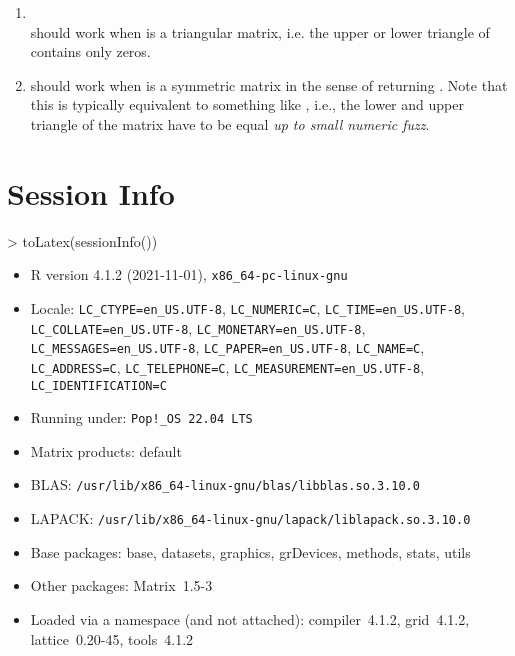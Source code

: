 \documentclass{article}
\begin{document}
\begin{description}
  \begin{enumerate}
  \item {} \\
       should work when  is a triangular matrix, i.e. the upper or
       lower triangle of  contains only zeros.

  \item {}
       should work when  is a symmetric matrix in the sense of
        returning .
       Note that this is typically equivalent to something like
       , i.e., the lower and upper
       triangle of the matrix have to be equal \emph{up to small
       numeric fuzz}.
  \end{enumerate}

\end{description}



\section{Session Info}

\begin{Schunk}
\begin{Sinput}
> toLatex(sessionInfo())
\end{Sinput}
\begin{itemize}\raggedright
  \item R version 4.1.2 (2021-11-01), \verb|x86_64-pc-linux-gnu|
  \item Locale: \verb|LC_CTYPE=en_US.UTF-8|, \verb|LC_NUMERIC=C|, \verb|LC_TIME=en_US.UTF-8|, \verb|LC_COLLATE=en_US.UTF-8|, \verb|LC_MONETARY=en_US.UTF-8|, \verb|LC_MESSAGES=en_US.UTF-8|, \verb|LC_PAPER=en_US.UTF-8|, \verb|LC_NAME=C|, \verb|LC_ADDRESS=C|, \verb|LC_TELEPHONE=C|, \verb|LC_MEASUREMENT=en_US.UTF-8|, \verb|LC_IDENTIFICATION=C|
  \item Running under: \verb|Pop!_OS 22.04 LTS|
  \item Matrix products: default
  \item BLAS:   \verb|/usr/lib/x86_64-linux-gnu/blas/libblas.so.3.10.0|
  \item LAPACK: \verb|/usr/lib/x86_64-linux-gnu/lapack/liblapack.so.3.10.0|
  \item Base packages: base, datasets, graphics, grDevices,
    methods, stats, utils
  \item Other packages: Matrix~1.5-3
  \item Loaded via a namespace (and not attached): compiler~4.1.2,
    grid~4.1.2, lattice~0.20-45, tools~4.1.2
\end{itemize}\end{Schunk}

%
\end{document}
